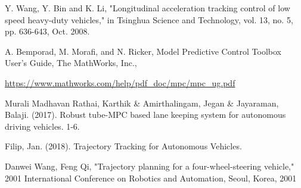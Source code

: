 \documentclass[conference,11pt]{IEEEtran}
\begin{document}
\begin{thebibliography}{00}
	
	Y. Wang, Y. Bin and K. Li, "Longitudinal acceleration tracking control of low speed heavy-duty vehicles," in Tsinghua Science and Technology, vol. 13, no. 5, pp. 636-643, Oct. 2008.
	
	A. Bemporad, M. Morafi, and N. Ricker, Model Predictive Control Toolbox User’s Guide, The MathWorks, Inc.,
	
		\url{https://www.mathworks.com/help/pdf_doc/mpc/mpc_ug.pdf}
		
	
	
	
	
	
	
	Murali Madhavan Rathai, Karthik \& Amirthalingam, Jegan \& Jayaraman, Balaji. (2017). Robust tube-MPC based lane keeping system for autonomous driving vehicles. 1-6.
	
	
	
	
	
	Filip, Jan. (2018). Trajectory Tracking for Autonomous Vehicles.
	
	Danwei Wang, Feng Qi, "Trajectory planning for a four-wheel-steering vehicle," 2001 International Conference on Robotics and Automation, Seoul, Korea, 2001
\end{thebibliography}
\end{document}

